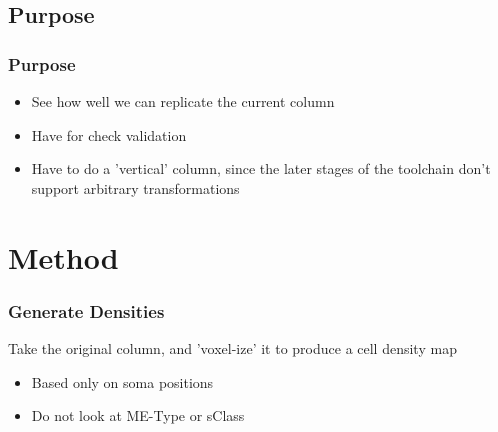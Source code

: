 \documentclass{beamer}
\begin{document}
\subsection{Purpose}
\begin{frame}
  \frametitle{Purpose}
  \begin{itemize}
     \item See how well we can replicate the current column
     \item Have for check validation
     \item Have to do a 'vertical' column, since the later stages of the toolchain don't support arbitrary transformations
  \end{itemize}
\end{frame}

\section{Method}
\begin{frame}
  \frametitle{Generate Densities}
  Take the original column, and 'voxel-ize' it to produce a cell density map
  \begin{itemize}
     \item Based only on soma positions
     \item Do not look at ME-Type or sClass
  \end{itemize}
\end{frame}
\end{document}
